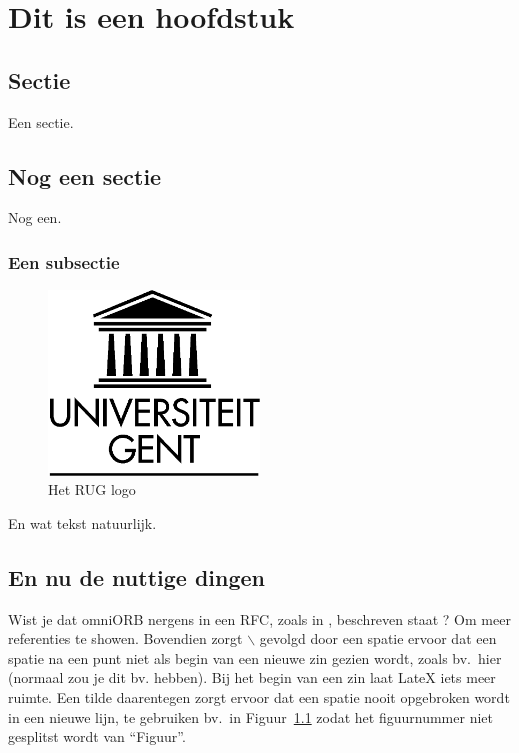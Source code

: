 \chapter{Dit is een hoofdstuk}

\section{Sectie}

Een sectie.

\section{Nog een sectie}
\label{sec:nogeensectie}

Nog een.

\subsection{Een subsectie}

\begin{figure}[htb]
\begin{center}
 \includegraphics[keepaspectratio,width=0.5\textwidth]{fig/ruglogo}
 \caption{Het RUG logo}
 \label{fig:ruglogo}
\end{center}
\end{figure}

En wat tekst natuurlijk.

\section{En nu de nuttige dingen}

Wist je dat omniORB\cite{six2013tarsos_jnmr} nergens in een RFC, zoals in \cite{six2013tarsos_jnmr}, beschreven staat ? Om meer referenties\cite{six2013tarsos_jnmr, six2015multimodal} te showen. Bovendien zorgt $\backslash$ gevolgd door een spatie ervoor dat een spatie na
een punt niet als begin van een nieuwe zin gezien wordt, zoals bv.\ hier (normaal zou je dit bv. hebben). Bij het begin van een zin laat LateX iets meer ruimte. Een tilde daarentegen
zorgt ervoor dat een spatie nooit opgebroken wordt in een nieuwe lijn, te gebruiken bv.\ in Figuur~\ref{fig:ruglogo} zodat het figuurnummer niet
gesplitst wordt van ``Figuur''.

